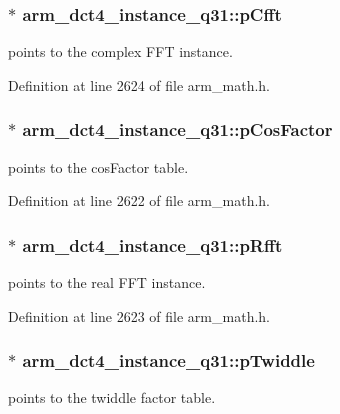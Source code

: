 \hypertarget{structarm__dct4__instance__q31_ac96579cfb28d08bb11dd2fe4c6303833}{
\subsubsection[{p\-Cfft}]{$\ast$ arm\-\_\-dct4\-\_\-instance\-\_\-q31\-::p\-Cfft}}\label{structarm__dct4__instance__q31_ac96579cfb28d08bb11dd2fe4c6303833}
points to the complex F\-F\-T instance. 

Definition at line 2624 of file arm\-\_\-math.\-h.

\hypertarget{structarm__dct4__instance__q31_af97204d1838925621fc82021a0c2d6c1}{
\subsubsection[{p\-Cos\-Factor}]{$\ast$ arm\-\_\-dct4\-\_\-instance\-\_\-q31\-::p\-Cos\-Factor}}\label{structarm__dct4__instance__q31_af97204d1838925621fc82021a0c2d6c1}
points to the cos\-Factor table. 

Definition at line 2622 of file arm\-\_\-math.\-h.

\hypertarget{structarm__dct4__instance__q31_af1487dab5e7963b85dc0fdc6bf492542}{
\subsubsection[{p\-Rfft}]{$\ast$ arm\-\_\-dct4\-\_\-instance\-\_\-q31\-::p\-Rfft}}\label{structarm__dct4__instance__q31_af1487dab5e7963b85dc0fdc6bf492542}
points to the real F\-F\-T instance. 

Definition at line 2623 of file arm\-\_\-math.\-h.

\hypertarget{structarm__dct4__instance__q31_a7db236e22673146bb1d2c962f0713f08}{
\subsubsection[{p\-Twiddle}]{$\ast$ arm\-\_\-dct4\-\_\-instance\-\_\-q31\-::p\-Twiddle}}\label{structarm__dct4__instance__q31_a7db236e22673146bb1d2c962f0713f08}
points to the twiddle factor table. 

